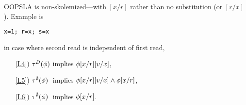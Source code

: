 OOPSLA is non-skolemized---with $[x/r]$ rather than no substitution (or $[r/x]$).
Example is
\begin{verbatim}
x=1; r=x; s=x
\end{verbatim}
in case where second read is independent of first read,

\begin{enumerate}
\item[\ref{L4})]
  $\aTr[\bEvs]\SB0(\aForm)$ implies $\aForm[\aLoc/\aReg][\aVal/\aLoc]$, 
\item[\ref{L5})]
  $\aTr[\emptyset]\SB0(\aForm)\;$ implies $\aForm[\aLoc/\aReg][\aVal/\aLoc]\land\aForm[\aLoc/\aReg]$,
\item[\ref{L6})]
  $\aTr[\emptyset]\SB0(\aForm)\;$ implies $\aForm[\aLoc/\aReg]$.
\end{enumerate}

